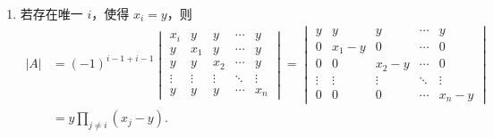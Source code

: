 \begin{exercise}
\begin{exgroup}
\begin{answer}
\begin{enumerate}
\begin{enumerate}
                        \item 若存在唯一 $i$，使得 $x_i = y$，则
                            \begin{align*}
                                |A| &= (-1)^{i - 1 + i - 1} \begin{vmatrix}
                                    x_i    & y      & y      & \cdots & y      \\
                                    y      & x_1    & y      & \cdots & y      \\
                                    y      & y      & x_2    & \cdots & y      \\
                                    \vdots & \vdots & \vdots & \ddots & \vdots \\
                                    y      & y      & y      & \cdots & x_n
                                \end{vmatrix}
                                = \begin{vmatrix}
                                    y      & y       & y       & \cdots & y       \\
                                    0      & x_1 - y & 0       & \cdots & 0       \\
                                    0      & 0       & x_2 - y & \cdots & 0       \\
                                    \vdots & \vdots  & \vdots  & \ddots & \vdots  \\
                                    0      & 0       & 0       & \cdots & x_n - y
                                \end{vmatrix} \\
                                &= y \prod_{j \neq i} (x_j - y).
                            \end{align*}


\end{enumerate}
\end{enumerate}
\end{answer}
\end{exgroup}
\end{exercise}
